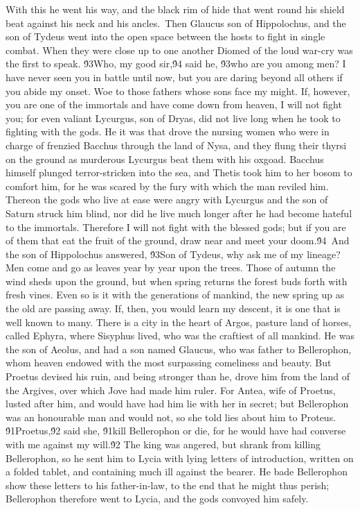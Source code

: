 {With this he went his way, and the black rim of hide that went round his shield beat against his neck and his ancles.\
Then Glaucus son of Hippolochus, and the son of Tydeus went into the open space between the hosts to fight in single combat. When they were close up to one another Diomed of the loud war-cry was the first to speak. \'93Who, my good sir,\'94 said he, \'93who are you among men? I have never seen you in battle until now, but you are daring beyond all others if you abide my onset. Woe to those fathers whose sons face my might. If, however, you are one of the immortals and have come down from heaven, I will not fight you; for even valiant Lycurgus, son of Dryas, did not live long when he took to fighting with the gods. He it was that drove the nursing women who were in charge of frenzied Bacchus through the land of Nysa, and they flung their thyrsi on the ground as murderous Lycurgus beat them with his oxgoad. Bacchus himself plunged terror-stricken into the sea, and Thetis took him to her bosom to comfort him, for he was scared by the fury with which the man reviled him. Thereon the gods who live at ease were angry with Lycurgus and the son of Saturn struck him blind, nor did he live much longer after he had become hateful to the immortals. Therefore I will not fight with the blessed gods; but if you are of them that eat the fruit of the ground, draw near and meet your doom.\'94\
And the son of Hippolochus answered, \'93Son of Tydeus, why ask me of my lineage? Men come and go as leaves year by year upon the trees. Those of autumn the wind sheds upon the ground, but when spring returns the forest buds forth with fresh vines. Even so is it with the generations of mankind, the new spring up as the old are passing away. If, then, you would learn my descent, it is one that is well known to many. There is a city in the heart of Argos, pasture land of horses, called Ephyra, where Sisyphus lived, who was the craftiest of all mankind. He was the son of Aeolus, and had a son named Glaucus, who was father to Bellerophon, whom heaven endowed with the most surpassing comeliness and beauty. But Proetus devised his ruin, and being stronger than he, drove him from the land of the Argives, over which Jove had made him ruler. For Antea, wife of Proetus, lusted after him, and would have had him lie with her in secret; but Bellerophon was an honourable man and would not, so she told lies about him to Proteus. \'91Proetus,\'92 said she, \'91kill Bellerophon or die, for he would have had converse with me against my will.\'92 The king was angered, but shrank from killing Bellerophon, so he sent him to Lycia with lying letters of introduction, written on a folded tablet, and containing much ill against the bearer. He bade Bellerophon show these letters to his father-in-law, to the end that he might thus perish; Bellerophon therefore went to Lycia, and the gods convoyed him safely.\
}
